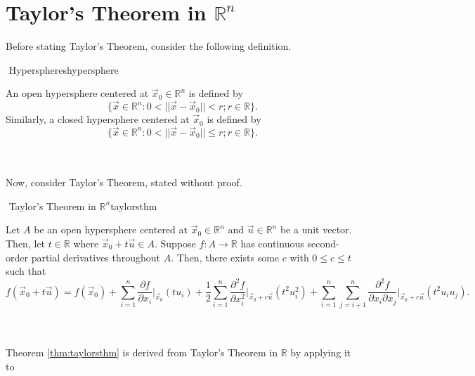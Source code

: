 \section{Taylor's Theorem in \(\mathbb{R}^n\)}

    Before stating Taylor's Theorem, consider the following definition.
    \begin{definition}{\Stop\,\,Hyperspheres}{hypersphere}

        An open hypersphere centered at \(\vec{x}_0\in\mathbb{R}^n\) is defined by
        \begin{equation*}
            \{\vec{x}\in\mathbb{R}^n:0<||\vec{x}-\vec{x}_0||<r;r\in\mathbb{R}\}.
        \end{equation*}
        Similarly, a closed hypersphere centered at \(\vec{x}_0\) is defined by
        \begin{equation*}
            \{\vec{x}\in\mathbb{R}^n:0<||\vec{x}-\vec{x}_0||\leq r;r\in\mathbb{R}\}.
        \end{equation*}

    \end{definition}
    \vphantom
    \\
    \\
    Now, consider Taylor's Theorem, stated without proof.
    \begin{theorem}{\Stop\,\,Taylor's Theorem in \(\mathbb{R}^n\)}{taylorsthm}

        Let \(A\) be an open hypersphere centered at \(\vec{x}_0\in\mathbb{R}^n\) and \(\vec{u}\in\mathbb{R}^n\) be a unit vector. Then, let \(t\in\mathbb{R}\) where \(\vec{x}_0+t\vec{u}\in A\). Suppose \(f:A\to\mathbb{R}\) has continuous second-order partial derivatives throughout \(A\). Then, there exists some \(c\) with \(0\leq c\leq t\) such that
        \begin{equation*}
            f(\vec{x}_0+t\vec{u})=f(\vec{x}_0)+\sum_{i=1}^n \frac{\partial f}{\partial x_i}\Big|_{\vec{x}_0}(tu_i)+\frac{1}{2}\sum_{i=1}^n \frac{\partial^2f}{\partial x_i^2}\Big|_{\vec{x}_0+c\vec{u}}(t^2u_i^2)+\sum_{i=1}^n\sum_{j=i+1}^n\frac{\partial^2f}{\partial x_i\partial x_j}\Big|_{\vec{x}_0+c\vec{u}}(t^2u_iu_j).
        \end{equation*}
        
    \end{theorem}
    \pagebreak
    \vphantom
    \\
    \\
    Theorem \ref{thm:taylorsthm} is derived from Taylor's Theorem in \(\mathbb{R}\) by applying it to
